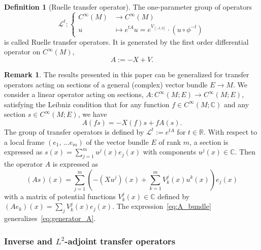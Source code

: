 \documentclass[10pt]{amsart}
\theoremstyle{definition}\newtheorem{defi}[theo]{Definition}\newtheorem{rema}[theo]{Remark}\newtheorem{exam}[theo]{Example}\newtheorem{exem}[theo]{Example}\newtheorem{nota}[theo]{Notation}
\newcommand{\clL}{\mathcal{L}}
\newcommand{\bbR}{\mathbb{R}}
\newcommand{\bbC}{\mathbb{C}}
\begin{document}
\begin{cBoxA}{}
\begin{defi}[Ruelle transfer operator]\label{def:transfer_operator}
The one-parameter group of operators
\begin{equation}\label{eq:def_Transfer_operator}
\clL^{t}:
\begin{cases}
C^{\infty}\left(M\right) & \rightarrow C^{\infty}\left(M\right)\\
u & \mapsto e^{tA}u=e^{V_{\left[-t,0\right]}}\cdot\left(u\circ\phi^{-t}\right)
\end{cases}
\end{equation}
is called Ruelle transfer operators. It is generated by the first order differential operator on $C^{\infty}(M)$,
\begin{equation}\label{eq:generator_A}
A:=-X+V.
\end{equation}
\end{defi}
\end{cBoxA}

\begin{rema}
The results presented in this paper can be generalized for transfer operators acting on sections of a general (complex) vector bundle $E\rightarrow M$. We consider a linear operator acting on sections, $A:C^{\infty}(M;E)\rightarrow C^{\infty}(M;E)$, satisfying the Leibniz condition that for any function $f\in C^{\infty}(M;\bbC)$ and any section $s\in C^{\infty}(M;E)$, we have
\[
A\left(fs\right)=-X\left(f\right)s+fA\left(s\right).
\]
The group of transfer operators is defined by $\clL^{t}:=e^{tA}$ for $t\in\bbR$. With respect to a local frame $(e_{1},\,\ldots e_{m})$ of the vector bundle $E$ of rank $m$, a section is expressed as $s(x)=\sum_{j=1}^{m}u^{j}(x)e_{j}(x)$ with components $u^{j}(x)\in\bbC$. Then the operator $A$ is expressed as
\begin{equation}\label{eq:A_bundle}
\left(As\right)\left(x\right)=\sum_{j=1}^{m}\left(-\left(Xu^{j}\right)\left(x\right)+\sum_{k=1}^{m}V_{k}^{j}\left(x\right)u^{k}\left(x\right)\right)e_{j}\left(x\right)
\end{equation}
with a matrix of potential functions $V_{k}^{j}(x)\in\bbC$ defined by $(Ae_{k})(x)=\sum_{j}V_{k}^{j}(x)e_{j}(x)$. The expression~\eqref{eq:A_bundle} generalizes~\eqref{eq:generator_A}.
\end{rema}


\subsubsection*{Inverse and \texorpdfstring{$L^{2}$}{L2}-adjoint transfer operators}
\end{document}
